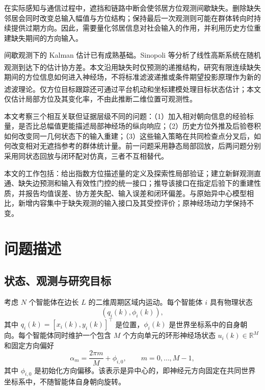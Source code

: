 \documentclass[UTF8,fontset=windows,11pt]{ctexart}
\newcommand{\upcite}[1]{\textsuperscript{\cite{#1}}}
\begin{document}
在实际感知与通信过程中，遮挡和链路中断会使邻居方位观测间歇缺失。删除缺失邻居会同时改变总输入幅值与方位结构；保持最后一次观测则可能在群体转向时持续提供过期方向。因此，需要量化邻居信息对社会输入的作用，并利用历史方位重建缺失期间的方向输入。

间歇观测下的 Kalman 估计已有成熟基础。Sinopoli 等分析了线性高斯系统在随机观测到达下的估计协方差\upcite{Sinopoli2004}。本文沿用缺失时仅预测的递推结构，研究有限连续缺失期间的方位信息如何进入神经场，不将标准滤波递推或条件期望投影原理作为新的滤波理论。仅方位目标跟踪还可通过平台机动和坐标建模处理目标状态估计\upcite{Xiourouppa2025}；本文仅估计局部方位及其变化率，不由此推断二维位置可观测性。

本文考察三个相互关联但证据层级不同的问题：（1）加入相对朝向信息的经验标量，是否比总幅值更能描述局部神经场的纵向响应；（2）历史方位外推及后验卷积如何改变同一几何状态下的输入重建；（3）这些输入策略在共同检查点分叉后，如何改变相对无遮挡参考的群体统计量。前一问题采用静态局部回放，后两问题分别采用同状态回放与闭环配对仿真，三者不互相替代。

本文的工作包括：给出指数方位描述量的定义及探索性局部验证；建立新鲜观测直通、缺失边预测和输入有效性门控的统一接口；推导该接口在指定后验下的重建性质，并报告均值误差、协方差失配、输入误差和闭环偏差。与原始异中心模型相比，新增内容集中于缺失观测的输入接口及其受控评价；原神经场动力学保持不变。

\section{问题描述}

\subsection{状态、观测与研究目标}

考虑 $N$ 个智能体在边长 $L$ 的二维周期区域内运动。每个智能体 $i$ 具有物理状态
\begin{equation}
 (q_i(k),\phi_i(k)),
\end{equation}
其中 $q_i(k)=[x_i(k),y_i(k)]^\top$ 是位置，$\phi_i(k)$ 是世界坐标系中的自身朝向。每个智能体同时维护一个包含 $M$ 个方向单元的环形神经场状态 $u_i(k)\in\mathbb R^M$ 和固定方向偏好
\begin{equation}
 \alpha_m=\frac{2\pi m}{M}+\phi_{i,0},\qquad m=0,\ldots,M-1,
\end{equation}
其中 $\phi_{i,0}$ 是初始化方向偏移。该表示是异中心的，即神经元方向固定在共同世界坐标系中，不随智能体自身朝向旋转。
\end{document}
